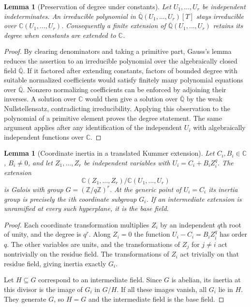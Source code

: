 \documentclass[11pt,a4paper]{article}
\numberwithin{equation}{section}
\newtheorem{lemma}[theorem]{Lemma}
\theoremstyle{definition}
\theoremstyle{remark}
\newcommand{\A}{\overline{\mathbb Q}}
\begin{document}
\begin{lemma}[Preservation of degree under constants]\label{gf:constant-descent}
Let $U_1,\ldots,U_r$ be independent indeterminates.  An irreducible
polynomial in $\A(U_1,\ldots,U_r)[T]$ stays irreducible over
$\mathbb C(U_1,\ldots,U_r)$.  Consequently a finite extension of
$\A(U_1,\ldots,U_r)$ retains its degree when constants are extended
to $\mathbb C$.
\end{lemma}
\begin{proof}
By clearing denominators and taking a primitive part, Gauss's lemma
reduces the assertion to an irreducible polynomial over the
algebraically closed field $\A$.  If it factored after extending
constants, factors of bounded degree with suitable normalized
coefficients would satisfy finitely many polynomial equations over
$\A$.  Nonzero normalizing coefficients can be enforced by adjoining
their inverses.  A solution over $\mathbb C$ would then give a solution
over $\A$ by the weak Nullstellensatz, contradicting irreducibility.
Applying this observation to the polynomial of a primitive element
proves the degree statement.  The same argument applies after any
identification of the independent $U_i$ with algebraically independent
functions over $\mathbb C$.
\end{proof}

\begin{lemma}[Coordinate inertia in a translated Kummer extension]
\label{gf:Kummer-inertia}
Let $C_i,B_i\in\mathbb C$, $B_i\ne0$, and let $Z_1,\ldots,Z_r$
be independent variables with $U_i=C_i+B_iZ_i^q$.  The extension
\[
 \mathbb C(Z_1,\ldots,Z_r)/\mathbb C(U_1,\ldots,U_r)
\]
is Galois with group $G=(\mathbb Z/q\mathbb Z)^r$.
At the generic point of $U_i=C_i$ its inertia group is precisely the
$i$th coordinate subgroup $G_i$.
If an intermediate extension is unramified at every such hyperplane,
it is the base field.
\end{lemma}
\begin{proof}
Each coordinate transformation multiplies $Z_i$ by an independent
$q$th root of unity, and the degree is $q^r$.  Along $Z_i=0$ the
function $U_i-C_i=B_iZ_i^q$ has order $q$.  The other variables are
units, and the transformations of $Z_j$ for $j\ne i$ act nontrivially
on the residue field.  The transformations of $Z_i$ act trivially on
that residue field, giving inertia exactly $G_i$.

Let $H\subseteq G$ correspond to an intermediate field.  Since $G$
is abelian, its inertia at this divisor is the image of $G_i$ in
$G/H$.  If all these images vanish, all $G_i$ lie in $H$.  They generate
$G$, so $H=G$ and the intermediate field is the base field.
\end{proof}
\end{document}
